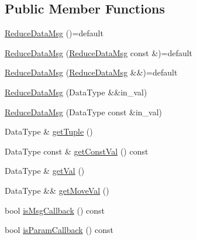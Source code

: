 \subsection*{Public Member Functions}
\begin{DoxyCompactItemize}
\item 
\hyperlink{structvt_1_1collective_1_1reduce_1_1operators_1_1_reduce_data_msg_ab5f090157aff94fa6b1c233ccc5e0e04}{Reduce\+Data\+Msg} ()=default
\item 
\hyperlink{structvt_1_1collective_1_1reduce_1_1operators_1_1_reduce_data_msg_a5a693c82cdef46b50e89bf897d579f96}{Reduce\+Data\+Msg} (\hyperlink{structvt_1_1collective_1_1reduce_1_1operators_1_1_reduce_data_msg}{Reduce\+Data\+Msg} const \&)=default
\item 
\hyperlink{structvt_1_1collective_1_1reduce_1_1operators_1_1_reduce_data_msg_ad5efa5f9fcee6b893ba873603bf56503}{Reduce\+Data\+Msg} (\hyperlink{structvt_1_1collective_1_1reduce_1_1operators_1_1_reduce_data_msg}{Reduce\+Data\+Msg} \&\&)=default
\item 
\hyperlink{structvt_1_1collective_1_1reduce_1_1operators_1_1_reduce_data_msg_af154e207e5fbafd8e78baa5986410b34}{Reduce\+Data\+Msg} (Data\+Type \&\&in\+\_\+val)
\item 
\hyperlink{structvt_1_1collective_1_1reduce_1_1operators_1_1_reduce_data_msg_aced8854f365eaf92ca71d527337fc804}{Reduce\+Data\+Msg} (Data\+Type const \&in\+\_\+val)
\item 
Data\+Type \& \hyperlink{structvt_1_1collective_1_1reduce_1_1operators_1_1_reduce_data_msg_a63578efc319e60a7f6972b25123a0b46}{get\+Tuple} ()
\item 
Data\+Type const  \& \hyperlink{structvt_1_1collective_1_1reduce_1_1operators_1_1_reduce_data_msg_a57969fcf4e5b2eda7aa6ec2cccc0c785}{get\+Const\+Val} () const
\item 
Data\+Type \& \hyperlink{structvt_1_1collective_1_1reduce_1_1operators_1_1_reduce_data_msg_ae4ed4be0171d566910da896198f38131}{get\+Val} ()
\item 
Data\+Type \&\& \hyperlink{structvt_1_1collective_1_1reduce_1_1operators_1_1_reduce_data_msg_a2f8b87edccc2e4db3c193350f066ca08}{get\+Move\+Val} ()
\item 
bool \hyperlink{structvt_1_1collective_1_1reduce_1_1operators_1_1_reduce_data_msg_ae7e1c5925ee2b28d59e4b8ac7632d673}{is\+Msg\+Callback} () const
\item 
bool \hyperlink{structvt_1_1collective_1_1reduce_1_1operators_1_1_reduce_data_msg_a2683d01e52705484436e441f9cdb2b7c}{is\+Param\+Callback} () const

\end{DoxyCompactItemize}
